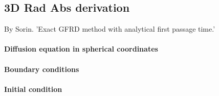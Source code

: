 \subsection{3D Rad Abs derivation}

By Sorin. 'Exact GFRD method with analytical first passage time.'

\paragraph{Diffusion equation in spherical coordinates}

\paragraph{Boundary conditions}

\paragraph{Initial condition}
